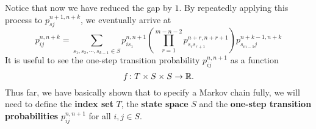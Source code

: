 \documentclass[math, code]{amznotes}
\theoremstyle{remark}
\begin{document}
Notice that now we have reduced the gap by $1$. By repeatedly applying this process to $p_{sj}^{n + 1, n + k}$, we eventually arrive at 
\begin{equation*}
    p_{ij}^{n, n + k} = \sum_{s_1, s_2, \cdots, s_{k - 1} \in S}p_{is_1}^{n, n + 1}\left(\prod_{r = 1}^{m - n - 2}p_{s_rs_{r + 1}}^{n + r, n + r + 1}\right)p_{s_{m - 1}j}^{n + k - 1, n + k}
\end{equation*}
It is useful to see the one-step transition probability $p_{ij}^{n, n + 1}$ as a function 
\begin{equation*}
    f \colon T \times S \times S \to \mathbb{R}.
\end{equation*}
Thus far, we have basically shown that to specify a Markov chain fully, we will need to define the \textbf{index set} $T$, the \textbf{state space} $S$ and the \textbf{one-step transition probabilities} $p_{ij}^{n, n + 1}$ for all $i, j \in S$.
\end{document}
